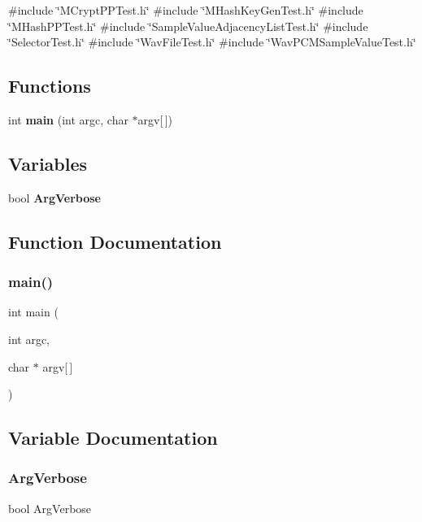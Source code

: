 {\ttfamily \#include \char`\"{}M\+Crypt\+P\+P\+Test.\+h\char`\"{}}\newline
{\ttfamily \#include \char`\"{}M\+Hash\+Key\+Gen\+Test.\+h\char`\"{}}\newline
{\ttfamily \#include \char`\"{}M\+Hash\+P\+P\+Test.\+h\char`\"{}}\newline
{\ttfamily \#include \char`\"{}Sample\+Value\+Adjacency\+List\+Test.\+h\char`\"{}}\newline
{\ttfamily \#include \char`\"{}Selector\+Test.\+h\char`\"{}}\newline
{\ttfamily \#include \char`\"{}Wav\+File\+Test.\+h\char`\"{}}\newline
{\ttfamily \#include \char`\"{}Wav\+P\+C\+M\+Sample\+Value\+Test.\+h\char`\"{}}\newline
\subsection*{Functions}
\begin{DoxyCompactItemize}
\item 
int \textbf{ main} (int argc, char $\ast$argv[$\,$])
\end{DoxyCompactItemize}
\subsection*{Variables}
\begin{DoxyCompactItemize}
\item 
bool \textbf{ Arg\+Verbose}
\end{DoxyCompactItemize}


\subsection{Function Documentation}
\mbox{\label{tests_2main_8cc_a0ddf1224851353fc92bfbff6f499fa97}} 
\subsubsection{main()}
{\footnotesize\ttfamily int main (\begin{DoxyParamCaption}\item[{int}]{argc,  }\item[{char $\ast$}]{argv[$\,$] }\end{DoxyParamCaption})}



\subsection{Variable Documentation}
\mbox{\label{tests_2main_8cc_a0ec04d0d9ca85a7839a58f0356557b67}} 
\subsubsection{Arg\+Verbose}
{\footnotesize\ttfamily bool Arg\+Verbose}

